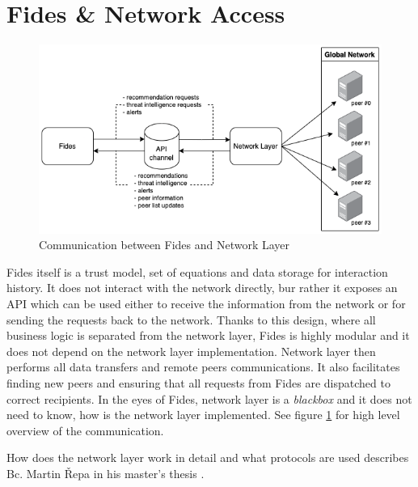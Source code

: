 \section{Fides \& Network Access}
\label{sec:fides-and-network-access}

\begin{figure}[ht]
    \centering
    \includegraphics[width=1.0\textwidth]{assets/tl_api_nl.png}
    \caption{Communication between Fides and Network Layer}
    \label{fig:fides-api-network}
\end{figure}

Fides itself is a trust model, set of equations and data storage for interaction history. 
It does not interact with the network directly, bur rather it exposes an API which can be used either to receive the information from the network or for sending the requests back to the network.
Thanks to this design, where all business logic is separated from the network layer, Fides is highly modular and it does not depend on the network layer implementation.
Network layer then performs all data transfers and remote peers communications.
It also facilitates finding new peers and ensuring that all requests from Fides are dispatched to correct recipients.
In the eyes of Fides, network layer is a \textit{blackbox} and it does not need to know, how is the network layer implemented.
See figure \ref{fig:fides-api-network} for high level overview of the communication.

How does the network layer work in detail and what protocols are used describes Bc. Martin Řepa in his master's thesis \cite{nl}.